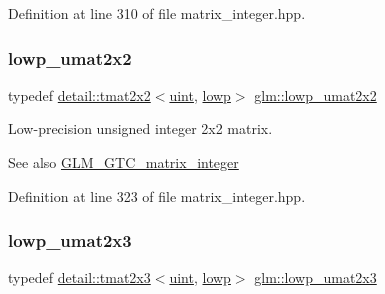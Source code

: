 Definition at line 310 of file matrix\+\_\+integer.\+hpp.

\mbox{\label{group__gtc__matrix__integer_gaa4dfe67706187e459004b9a6c500b048}} 
\subsubsection{\texorpdfstring{lowp\+\_\+umat2x2}{lowp\_umat2x2}}
{\footnotesize\ttfamily typedef \hyperlink{structglm_1_1detail_1_1tmat2x2}{detail\+::tmat2x2}$<$\hyperlink{group__core__precision_ga4fd29415871152bfb5abd588334147c8}{uint}, \hyperlink{namespaceglm_a0f04f086094c747d227af4425893f545ae161af3fc695e696ce3bf69f7332bc2d}{lowp}$>$ \hyperlink{group__gtc__matrix__integer_gaa4dfe67706187e459004b9a6c500b048}{glm\+::lowp\+\_\+umat2x2}}

Low-\/precision unsigned integer 2x2 matrix. \begin{DoxySeeAlso}{See also}
\hyperlink{group__gtc__matrix__integer}{G\+L\+M\+\_\+\+G\+T\+C\+\_\+matrix\+\_\+integer} 
\end{DoxySeeAlso}


Definition at line 323 of file matrix\+\_\+integer.\+hpp.

\mbox{\label{group__gtc__matrix__integer_ga4c8388c4a03f228c0e12dd7b7445115d}} 
\subsubsection{\texorpdfstring{lowp\+\_\+umat2x3}{lowp\_umat2x3}}
{\footnotesize\ttfamily typedef \hyperlink{structglm_1_1detail_1_1tmat2x3}{detail\+::tmat2x3}$<$\hyperlink{group__core__precision_ga4fd29415871152bfb5abd588334147c8}{uint}, \hyperlink{namespaceglm_a0f04f086094c747d227af4425893f545ae161af3fc695e696ce3bf69f7332bc2d}{lowp}$>$ \hyperlink{group__gtc__matrix__integer_ga4c8388c4a03f228c0e12dd7b7445115d}{glm\+::lowp\+\_\+umat2x3}}

